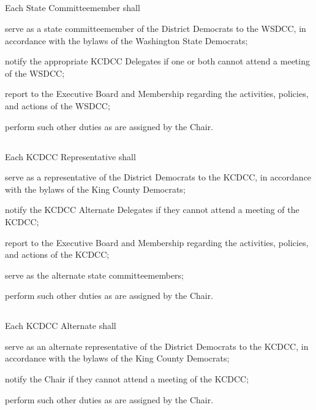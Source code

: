 \subsection{}
Each State Committeemember shall
\begin{inlinealphalist}
    \item serve as a state committeemember of the \fortythird{} District Democrats to the WSDCC, in accordance with the bylaws of the Washington State Democrats;
    \item notify the appropriate KCDCC Delegates if one or both cannot attend a meeting of the WSDCC;
    \item report to the Executive Board and Membership regarding the activities, policies, and actions of the WSDCC;
    \item perform such other duties as are assigned by the Chair.
\end{inlinealphalist}

\subsection{}
Each KCDCC Representative shall
\begin{inlinealphalist}
    \item serve as a representative of the \fortythird{} District Democrats to the KCDCC, in accordance with the bylaws of the King County Democrats;
    \item notify the KCDCC Alternate Delegates if they cannot attend a meeting of the KCDCC;
    \item report to the Executive Board and Membership regarding the activities, policies, and actions of the KCDCC;
    \item serve as the alternate state committeemembers;
    \item perform such other duties as are assigned by the Chair.
\end{inlinealphalist}

\subsection{}
Each KCDCC Alternate shall
\begin{inlinealphalist}
    \item serve as an alternate representative of the \fortythird{} District Democrats to the KCDCC, in accordance with the bylaws of the King County Democrats;
    \item notify the Chair if they cannot attend a meeting of the KCDCC;
    \item perform such other duties as are assigned by the Chair.
\end{inlinealphalist}

